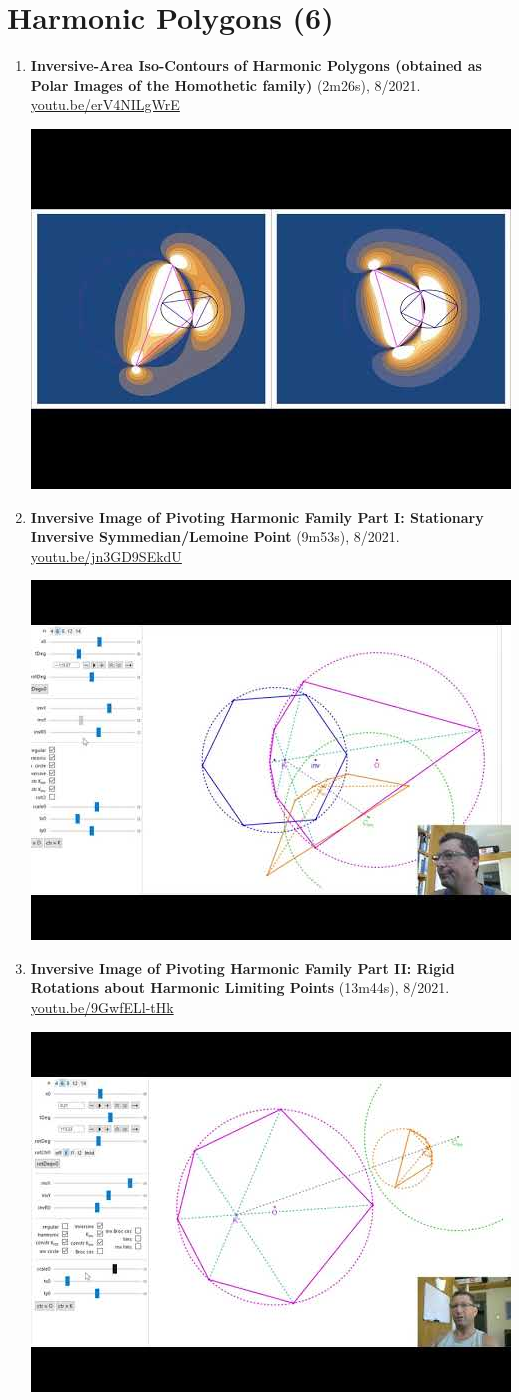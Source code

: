 \documentclass[12pt]{article}
\begin{document}
\section{Harmonic Polygons (6)}

\begin{enumerate}[resume]
\item \textbf{Inversive-Area Iso-Contours of Harmonic Polygons (obtained as Polar Images of the Homothetic family)} (2m26s), 8/2021. \href{https://youtu.be/erV4NILgWrE}{\url{youtu.be/erV4NILgWrE}}
\begin{center}\includegraphics[width=.5\textwidth]{pics/erV4NILgWrE.jpg}\end{center}
% 
\item \textbf{Inversive Image of Pivoting Harmonic Family Part I: Stationary Inversive Symmedian/Lemoine Point} (9m53s), 8/2021. \href{https://youtu.be/jn3GD9SEkdU}{\url{youtu.be/jn3GD9SEkdU}}
\begin{center}\includegraphics[width=.5\textwidth]{pics/jn3GD9SEkdU.jpg}\end{center}
% 
\item \textbf{Inversive Image of Pivoting Harmonic Family Part II: Rigid Rotations about Harmonic Limiting Points} (13m44s), 8/2021. \href{https://youtu.be/9GwfELl-tHk}{\url{youtu.be/9GwfELl-tHk}}
\begin{center}\includegraphics[width=.5\textwidth]{pics/9GwfELl-tHk.jpg}\end{center}

\end{enumerate}
\end{document}
